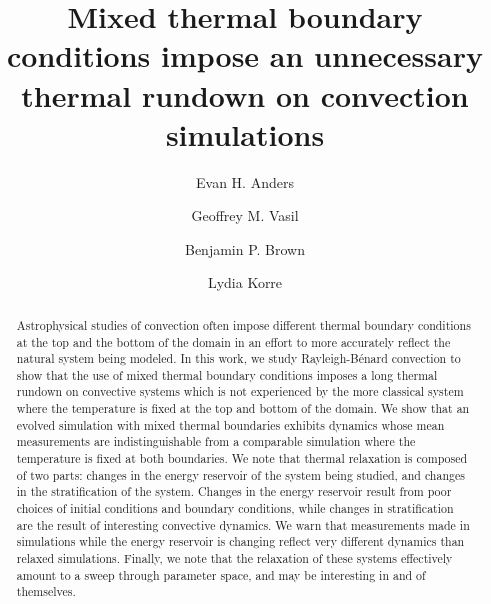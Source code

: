 \documentclass[aps, pre, onecolumn, nofootinbib, notitlepage, groupedaddress, amsfonts, amssymb, amsmath, longbibliography]{revtex4-1}
\newcommand{\RB}{Rayleigh-B\'{e}nard }
\begin{document}
\author{Evan H. Anders}
\author{Geoffrey M. Vasil}
\author{Benjamin P. Brown}
\author{Lydia Korre}

\title{Mixed thermal boundary conditions impose an unnecessary thermal rundown on convection simulations}

\begin{abstract}
Astrophysical studies of convection often impose different thermal boundary conditions at the top and the bottom of the domain in an effort to more accurately reflect the natural system being modeled.
In this work, we study \RB convection to show that the use of mixed thermal boundary conditions imposes a long thermal rundown on convective systems which is not experienced by the more classical system where the temperature is fixed at the top and bottom of the domain.
We show that an evolved simulation with mixed thermal boundaries exhibits dynamics whose mean measurements are indistinguishable from a comparable simulation where the temperature is fixed at both boundaries.
We note that thermal relaxation is composed of two parts: changes in the energy reservoir of the system being studied, and changes in the stratification of the system.
Changes in the energy reservoir result from poor choices of initial conditions and boundary conditions, while changes in stratification are the result of interesting convective dynamics.
We warn that measurements made in simulations while the energy reservoir is changing reflect very different dynamics than relaxed simulations.
Finally, we note that the relaxation of these systems effectively amount to a sweep through parameter space, and may be interesting in and of themselves.
\end{abstract}
\maketitle

\end{document}
